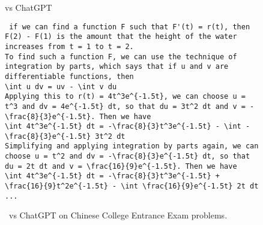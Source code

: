 \begin{figure}[H]
\begin{AIbox}{\DV vs ChatGPT}
\begin{verbatim}
 if we can find a function F such that F'(t) = r(t), then F(2) - F(1) is the amount that the height of the water increases from t = 1 to t = 2.
To find such a function F, we can use the technique of integration by parts, which says that if u and v are differentiable functions, then
\int u dv = uv - \int v du
Applying this to r(t) = 4t^3e^{-1.5t}, we can choose u = t^3 and dv = 4e^{-1.5t} dt, so that du = 3t^2 dt and v = -\frac{8}{3}e^{-1.5t}. Then we have
\int 4t^3e^{-1.5t} dt = -\frac{8}{3}t^3e^{-1.5t} - \int -\frac{8}{3}e^{-1.5t} 3t^2 dt
Simplifying and applying integration by parts again, we can choose u = t^2 and dv = -\frac{8}{3}e^{-1.5t} dt, so that du = 2t dt and v = \frac{16}{9}e^{-1.5t}. Then we have
\int 4t^3e^{-1.5t} dt = -\frac{8}{3}t^3e^{-1.5t} + \frac{16}{9}t^2e^{-1.5t} - \int \frac{16}{9}e^{-1.5t} 2t dt
...
\end{verbatim}
\end{AIbox}
\caption{\DV~vs ChatGPT on Chinese College Entrance Exam problems.}
\end{figure}
